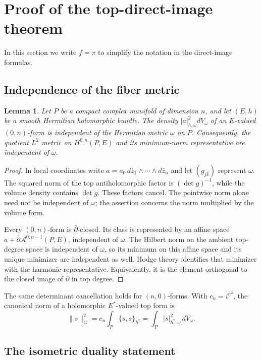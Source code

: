 \documentclass[11pt,reqno]{amsart}
\numberwithin{equation}{section}
\newtheorem{lemma}[theorem]{Lemma}
\theoremstyle{definition}
\theoremstyle{remark}
\newcommand{\db}{\bar\partial}
\newcommand{\cA}{\mathcal A}
\newcommand{\dV}{\,dV}
\newcommand{\norm}[1]{\lVert #1\rVert}
\begin{document}
\section{Proof of the top-direct-image theorem}\label{sec:top-proof}
In this section we write $f=\pi$ to simplify the notation in the direct-image formulas.
\subsection{Independence of the fiber metric}

\begin{lemma}\label{lem:independence}
Let $P$ be a compact complex manifold of dimension $n$, and let $(E,h)$ be a smooth Hermitian holomorphic bundle. The density $|a|_{h,\omega}^2dV_\omega$ of an $E$-valued $(0,n)$-form is independent of the Hermitian metric $\omega$ on $P$. Consequently, the quotient $L^2$ metric on $H^{0,n}(P,E)$ and its minimum-norm representative are independent of $\omega$.
\end{lemma}
\begin{proof}
In local coordinates write $a=a_0\,d\bar z_1\wedge\cdots\wedge d\bar z_n$ and let $(g_{j\bar k})$ represent $\omega$. The squared norm of the top antiholomorphic factor is $(\det g)^{-1}$, while the volume density contains $\det g$. These factors cancel. The pointwise norm alone need not be independent of $\omega$; the assertion concerns the norm multiplied by the volume form.

Every $(0,n)$-form is $\db$-closed. Its class is represented by an affine space $a+\db\cA^{0,n-1}(P,E)$, independent of $\omega$. The Hilbert norm on the ambient top-degree space is independent of $\omega$, so its minimum on this affine space and its unique minimizer are independent as well. Hodge theory identifies that minimizer with the harmonic representative. Equivalently, it is the element orthogonal to the closed image of $\db$ in top degree.
\end{proof}

The same determinant cancellation holds for $(n,0)$-forms. With $c_n=i^{n^2}$, the canonical norm of a holomorphic $E^*$-valued top form is
\begin{equation}\label{eq:canonical}
 \norm{s}_{G}^2=c_n\int_P\{s,s\}_{h^*}
 =\int_P|s|_{h^*,\omega}^2\dV_\omega.
\end{equation}

\subsection{The isometric duality statement}
\end{document}
